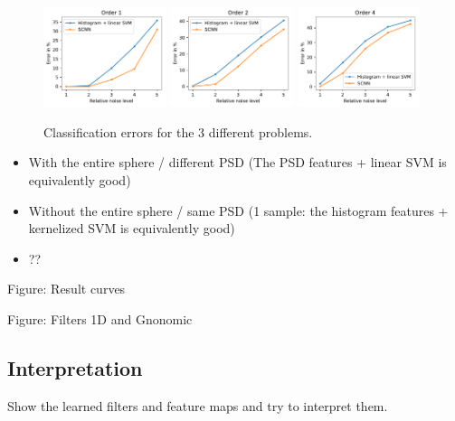 \documentclass[preprint,12pt,authoryear]{elsarticle}
\newcommand{\assign}[1]{{\color[rgb]{.8,.5,.8}{Assigned: #1 }}}
\newcommand{\1}{\b{1}}              %
\newcommand{\0}{\b{0}}              %
\begin{document}
\begin{figure}[!ht]
\centering
\includegraphics[width=0.32\textwidth]{figures/result_order1.pdf}
\includegraphics[width=0.32\textwidth]{figures/result_order2.pdf}
\includegraphics[width=0.32\textwidth]{figures/result_order4.pdf}
\caption{Classification errors for the 3 different problems.}
\label{fig:results}
\end{figure}

\assign{Nathanaël, Tomek}

\begin{itemize}
	\item With the entire sphere / different PSD (The PSD features + linear SVM is equivalently good)
	\item Without the entire sphere / same PSD (1 sample: the histogram features + kernelized SVM is equivalently good)
	\item ??
\end{itemize}


Figure: Result curves 

Figure: Filters 1D and Gnonomic

\subsection{Interpretation}
\assign{Nathanaël, Tomek, Michaël}

Show the learned filters and feature maps and try to interpret them.
\end{document}
